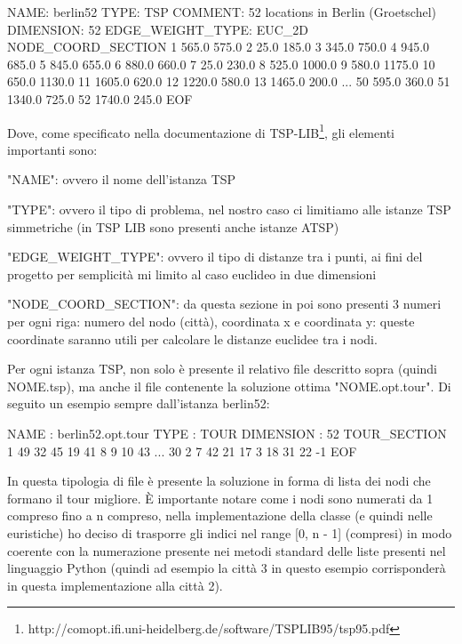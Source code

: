 \documentclass[a4paper,12pt]{report}
\begin{document}
\begin{myverbatim}[title={berlin52.tsp}]
NAME: berlin52
TYPE: TSP
COMMENT: 52 locations in Berlin (Groetschel)
DIMENSION: 52
EDGE_WEIGHT_TYPE: EUC_2D
NODE_COORD_SECTION
1 565.0 575.0
2 25.0 185.0
3 345.0 750.0
4 945.0 685.0
5 845.0 655.0
6 880.0 660.0
7 25.0 230.0
8 525.0 1000.0
9 580.0 1175.0
10 650.0 1130.0
11 1605.0 620.0 
12 1220.0 580.0
13 1465.0 200.0
...
50 595.0 360.0
51 1340.0 725.0
52 1740.0 245.0
EOF
\end{myverbatim}
Dove, come specificato nella documentazione di TSP-LIB\footnote{http://comopt.ifi.uni-heidelberg.de/software/TSPLIB95/tsp95.pdf}, gli elementi importanti sono:
\begin{legal}
  \item "NAME": ovvero il nome dell'istanza TSP
  \item "TYPE": ovvero il tipo di problema, nel nostro caso ci limitiamo alle istanze TSP simmetriche (in TSP LIB sono presenti anche istanze ATSP)
  \item "EDGE\_WEIGHT\_TYPE": ovvero il tipo di distanze tra i punti, ai fini del progetto per semplicità mi limito al caso euclideo in due dimensioni
  \item "NODE\_COORD\_SECTION": da questa sezione in poi sono presenti 3 numeri per ogni riga: numero del nodo (città), coordinata x e coordinata y: queste coordinate saranno utili per calcolare le distanze euclidee tra i nodi.
\end{legal}
Per ogni istanza TSP, non solo è presente il relativo file descritto sopra (quindi NOME.tsp), ma anche il file contenente la soluzione ottima "NOME.opt.tour". Di seguito un esempio sempre dall'istanza berlin52:
\begin{myverbatim}[title={berlin52.opt.tsp}]
NAME : berlin52.opt.tour
TYPE : TOUR
DIMENSION : 52
TOUR_SECTION
1
49
32
45
19
41
8
9
10
43
...
30
2
7
42
21
17
3
18
31
22
-1
EOF
\end{myverbatim}
In questa tipologia di file è presente la soluzione in forma di lista dei nodi che formano il tour migliore. È importante notare come i nodi sono numerati da 1 compreso fino a n compreso, nella implementazione della classe (e quindi nelle euristiche) ho deciso di trasporre gli indici nel range [0, n - 1] (compresi) in modo coerente con la numerazione presente nei metodi standard delle liste presenti nel linguaggio Python (quindi ad esempio la città 3 in questo esempio corrisponderà in questa implementazione alla città 2).
\end{document}

